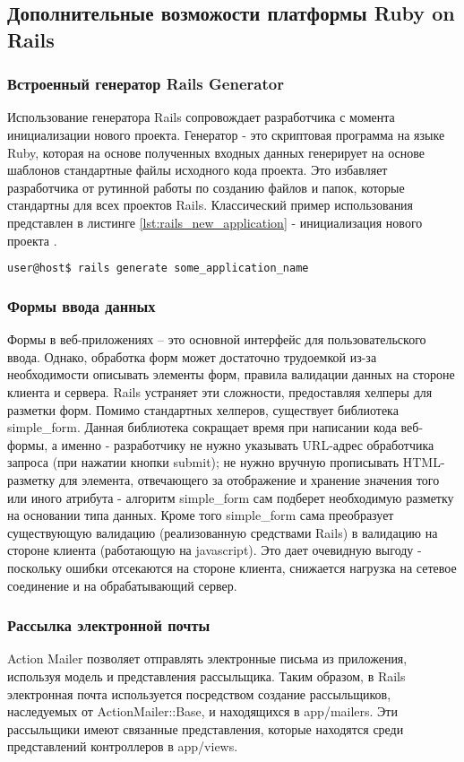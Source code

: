 \subsection{Дополнительные возможости платформы Ruby on Rails}
\subsubsection{Встроенный генератор Rails Generator}
Использование генератора Rails сопровождает разработчика с момента инициализации
нового проекта. Генератор - это скриптовая программа на языке Ruby, которая на
основе полученных входных данных генерирует на основе шаблонов стандартные файлы
исходного кода проекта. Это избавляет разработчика от рутинной работы по
созданию файлов и папок, которые стандартны для всех проектов Rails.
Классический пример использования представлен в листинге
\ref{lst:rails_new_application}  - инициализация нового проекта .

\begin{lstlisting}[language=Bash,caption=Создание
нового приложения,label={lst:rails_new_application}] 
user@host$ rails generate some_application_name
\end{lstlisting}

\subsubsection{Формы ввода данных}
Формы в веб-приложениях – это основной интерфейс для пользовательского ввода.
Однако, обработка форм может достаточно трудоемкой из-за необходимости описывать
элементы форм, правила валидации данных на стороне клиента и сервера. Rails
устраняет эти сложности, предоставляя хелперы для разметки форм. Помимо
стандартных хелперов, существует библиотека simple\_form. Данная библиотека
сокращает время при написании кода веб-формы, а именно - разработчику не нужно
указывать URL-адрес обработчика запроса (при нажатии кнопки submit); не нужно
вручную прописывать HTML-разметку для элемента, отвечающего за отображение и
хранение значения того или иного атрибута - алгоритм simple\_form сам подберет
необходимую разметку на основании типа данных. Кроме того simple\_form сама
преобразует существующую валидацию (реализованную средствами Rails) в валидацию
на стороне клиента (работающую на javascript). Это дает очевидную выгоду -
поскольку ошибки отсекаются на стороне клиента, снижается нагрузка на сетевое
соединение и на обрабатывающий сервер.

\subsubsection{Рассылка  электронной почты}
Action Mailer позволяет отправлять электронные письма из приложения, используя
модель и представления рассыльщика. Таким образом, в Rails электронная почта
используется посредством создание рассыльщиков, наследуемых от
ActionMailer::Base, и находящихся в app/mailers. Эти рассыльщики имеют связанные
представления, которые находятся среди представлений контроллеров в app/views.

